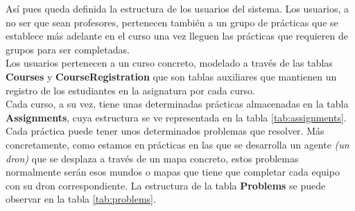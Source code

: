 \begin{table}[]
\centering
{}
\caption{Columna adicional en la tabla \textbf{Users} de la base de datos}
\label{tab:usersdb2}
\end{table}

Así pues queda definida la estructura de los usuarios del sistema. Los usuarios, a no ser que sean profesores, pertenecen también a un grupo de prácticas que se establece más adelante en el curso una vez lleguen las prácticas que requieren de grupos para ser completadas.\\

Los usuarios pertenecen a un curso concreto, modelado a través de las tablas \textbf{Courses} y \textbf{CourseRegistration} que son tablas auxiliares que mantienen un registro de los estudiantes en la asignatura por cada curso.\\

Cada curso, a su vez, tiene unas determinadas prácticas almacenadas en la tabla \textbf{Assignments}, cuya estructura se ve representada en la tabla \ref{tab:assignments}. Cada práctica puede tener unos determinados problemas que resolver. Más concretamente, como estamos en prácticas en las que se desarrolla un agente \textit{(un dron)} que se desplaza a través de un mapa concreto, estos problemas normalmente serán esos mundos o mapas que tiene que completar cada equipo con su dron correspondiente. La estructura de la tabla \textbf{Problems} se puede observar en la tabla \ref{tab:problems}.

